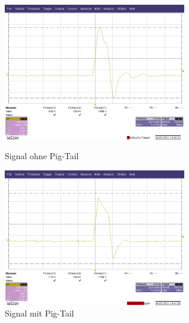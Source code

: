 \begin{figure}[htb]
    \centering
    \begin{minipage}[t]{0.45\linewidth}
        \centering
        \includegraphics[width=8cm]{Bilder/TP19-ohne-PigTail.png}
        \caption{Signal ohne Pig-Tail}
    \end{minipage}%
    \hfill
    \begin{minipage}[t]{0.45\linewidth}
        \centering
        \includegraphics[width=8cm]{Bilder/TP19-mit-PigTail.png}
        \caption{Signal mit Pig-Tail}
    \end{minipage}
\end{figure}
